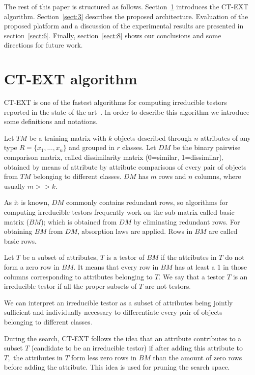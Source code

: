 \documentclass[authoryear,preprint,review,12pt]{elsarticle}
\begin{document}
The rest of this paper is structured as follows. Section~\ref{sect:2} introduces the CT-EXT algorithm. 
Section~\ref{sect:3} describes the proposed architecture.  
Evaluation of the proposed platform and a discussion of the experimental results are 
presented in section~\ref{sect:6}. Finally, section~\ref{sect:8} shows our conclusions and some directions 
for future work.


\section{CT-EXT algorithm}
\label{sect:2}
CT-EXT is one of the fastest algorithms for computing irreducible testors reported in the 
state of the art~\citep{R22,R23,Piza13}. In order to describe this algorithm we introduce some definitions 
and notations.


Let $TM$ be a training matrix with $k$ objects described through $n$
attributes of any type $R=\{x_{1},\ldots,x_{n}\}$ and grouped in $r$
classes. Let $DM$ be the binary pairwise comparison matrix, called dissimilarity matrix 
(0=similar, 1=dissimilar), obtained by means of attribute by attribute comparisons of every
pair of objects from $TM$ belonging to different classes. $DM$ has
$m$ rows and $n$ columns, where usually $m>>k$.

As it is known, $DM$ commonly contains redundant rows, so algorithms
for computing irreducible testors frequently work on the sub-matrix called basic matrix ($BM$);
which is obtained from $DM$ by eliminating redundant rows. For obtaining
$BM$ from $DM$, absorption laws are applied. Rows in $BM$ are called basic rows.

Let $T$ be a subset of attributes, $T$ is a testor of $BM$ if the attributes in $T$ do not form a zero row 
in $BM$. It means that every row in $BM$ has at least a 1 in those columns corresponding to attributes 
belonging to $T$. We say that a testor $T$ is an irreducible testor if all the proper subsets of $T$ are not testors.

We can interpret an irreducible testor as a subset of attributes being jointly sufficient and individually necessary
to differentiate every pair of objects belonging to different classes.

During the search, CT-EXT follows the idea that an attribute contributes to a subset $T$ (candidate to 
be an irreducible testor) if after adding this attribute to $T,$ the attributes in $T$ form less zero rows 
in $BM$ than the amount of zero rows before adding the attribute. This idea is used for pruning the search
space.
\end{document}
